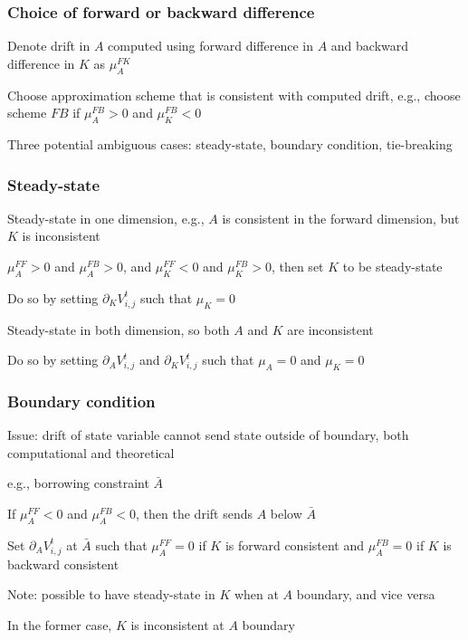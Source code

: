\documentclass[aspectratio=169]{beamer}
\newenvironment{wideitemize}{\itemize\addtolength{\itemsep}{10pt}}{\enditemize}
\begin{document}
\begin{frame}
    \frametitle{Choice of forward or backward difference}

    \begin{wideitemize}
        \item Denote drift in $A$ computed using forward difference in $A$ and backward difference in $K$ as $\mu_A^{FK}$
        \item Choose approximation scheme that is consistent with computed drift, e.g., choose scheme $FB$ if $\mu_A^{FB}>0$ and $\mu_K^{FB}<0$
        \item Three potential ambiguous cases: steady-state, boundary condition, tie-breaking
    \end{wideitemize}

\end{frame}

\begin{frame}
    \frametitle{Steady-state}

    \begin{wideitemize}
        \item Steady-state in one dimension, e.g., $A$ is consistent in the forward dimension, but $K$ is inconsistent
        \item $\mu_A^{FF} > 0$ and $\mu_A^{FB} > 0$, and $\mu_K^{FF} < 0$ and $\mu_K^{FB} > 0$, then set $K$ to be steady-state
        \item Do so by setting $\partial_K V_{i,j}^t$ such that $\mu_K = 0$
        \item Steady-state in both dimension, so both $A$ and $K$ are inconsistent
        \item Do so by setting $\partial_A V_{i,j}^t$ and $\partial_K V_{i,j}^t$ such that $\mu_A = 0$ and $\mu_K = 0$
    \end{wideitemize}

\end{frame}

\begin{frame}
    \frametitle{Boundary condition}

    \begin{wideitemize}
        \item Issue: drift of state variable cannot send state outside of boundary, both computational and theoretical
        \item e.g., borrowing constraint $\bar{A}$
        \item If $\mu_A^{FF} < 0$ and $\mu_A^{FB} < 0$, then the drift sends $A$ below $\bar{A}$
        \item Set $\partial_A V_{i,j}^t$ at $\bar{A}$ such that $\mu_A^{FF} = 0$ if $K$ is forward consistent and $\mu_A^{FB} = 0$ if $K$ is backward consistent
        \item Note: possible to have steady-state in $K$ when at $A$ boundary, and vice versa
        \item In the former case, $K$ is inconsistent at $A$ boundary
    \end{wideitemize}

\end{frame}
\end{document}
